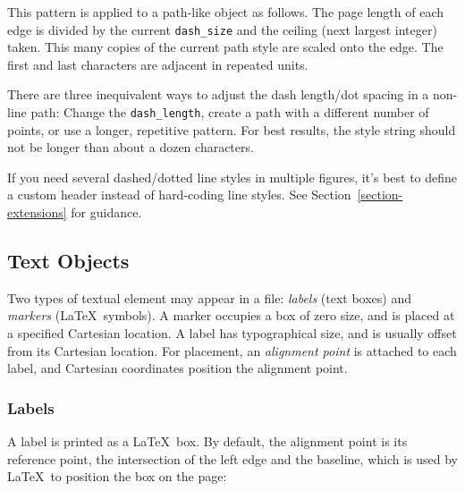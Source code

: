 \documentclass[12pt,letterpaper]{book}
\newcommand{\code}[1]{\texttt{#1}}
\begin{document}
This pattern is applied to a path-like object as follows. The page
length of each edge is divided by the current \code{dash\_size} and
the ceiling (next largest integer) taken. This many copies of the
current path style are scaled onto the edge. The first and last
characters are adjacent in repeated units.

There are three inequivalent ways to adjust the dash length/dot
spacing in a non-line path: Change the \code{dash\_length}, create a
path with a different number of points, or use a longer, repetitive
pattern.  For best results, the style string should not be longer than
about a dozen characters.

If you need several dashed/dotted line styles in multiple figures,
it's best to define a custom header instead of hard-coding line
styles. See Section~\ref{section-extensions} for guidance.


\subsection{Text Objects}

Two types of textual element may appear in a file: \emph{labels} (text
boxes) and \emph{markers} (\LaTeX\ symbols). A marker occupies a box
of zero size, and is placed at a specified Cartesian location. A label
has typographical size, and is usually offset from its Cartesian
location. For placement, an \emph{alignment point} is attached to each
label, and Cartesian coordinates position the alignment point.

\subsubsection*{Labels}

A label is printed as a \LaTeX\ box.  By default, the alignment point
is its reference point, the intersection of the left edge and the
baseline, which is used by \LaTeX\ to position the box on the
page:
\end{document}
